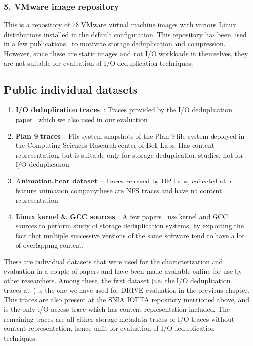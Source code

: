 \subsubsection{5. VMware image repository}
This is a repository of 78 VMware virtual machine images with various
Linux distributions installed in the default configuration. This 
repository has been used in a few publications~\cite{p-dedupe, ddelta} to
motivate storage deduplication and compression. However, since these
are static images and not I/O workloads in themselves, they are not
suitable for evaluation of I/O deduplication techniques.

\subsection{Public individual datasets}
\begin{enumerate}
	\item \textbf{I/O deduplication traces}~\cite{iodedup-online}: Traces provided by the I/O deduplication paper~\cite{iodedup} which we also used in our evaluation
	\item \textbf{Plan 9 traces}~\cite{p9-traces}: File system snapshots of the Plan 9 file system deployed in the Computing Sciences Research center of Bell Labs. Has content representation, but is suitable only for storage deduplication studies, not for I/O deduplication
	\item \textbf{Animation-bear dataset}~\cite{animation-bear}: Traces released by HP Labs, collected at a feature animation company\textemdash{}these are NFS traces and have no content representation
	\item \textbf{Linux kernel \& GCC sources}~\cite{kernel-src, gcc-src}: A few papers~\cite{p-dedupe, ddelta} use kernel and GCC sources to perform study of storage deduplication systems, by exploiting the fact that multiple successive versions of the same software tend to have a lot of overlapping content.
\end{enumerate}

These are individual datasets that were used for the 
characterization and evaluation in a couple of papers
and have been made available online for use by other researchers.
Among these, the first dataset (i.e. the I/O deduplication traces at~\cite{iodedup-online})
is the one we have used for DRIVE evaluation in the previous chapter. This
traces are also present at the SNIA IOTTA repository mentioned above, and 
is the only I/O access trace which has content representation included.
The remaining traces are all either storage metadata traces or I/O traces
without content representation, hence unfit for evaluation of I/O deduplication
techniques.

